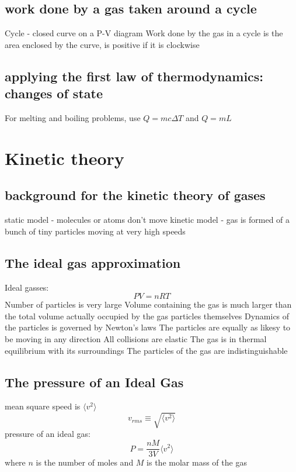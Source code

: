 \documentclass[twocolumn]{article}
\begin{document}
\subsection{work done by a gas taken around a cycle}
\begin{outline}
\1 Cycle - closed curve on a P-V diagram
\1 Work done by the gas in a cycle is the area enclosed by the curve, is positive if it is clockwise
\end{outline}
\subsection{applying the first law of thermodynamics: changes of state}
\begin{outline}
\1 For melting and boiling problems, use \(Q=mc\Delta T\) and \(Q=mL\)
\end{outline}
\section{Kinetic theory} 
\subsection{background for the kinetic theory of gases}
\begin{outline}
\1 static model - molecules or atoms don't move
\1 kinetic model - gas is formed of a bunch of tiny particles moving at very high speeds
\end{outline}
\subsection{The ideal gas approximation}
\begin{outline}
\1 Ideal gasses: \[PV=nRT\]
\2 Number of particles is very large
\2 Volume containing the gas is much larger than the total volume actually occupied by the gas particles themselves
\2 Dynamics of the particles is governed by Newton's laws
\2 The particles are equally as likesy to be moving in any direction
\2 All collisions are elastic
\2 The gas is in thermal equilibrium with its surroundings
\2 The particles of the gas are indistinguishable
\end{outline}
\subsection{The pressure of an Ideal Gas}
\begin{outline}
\1 mean square speed is $\langle v^2\rangle$
\0 \[v_{rms}\equiv\sqrt{\langle v^2\rangle}\]
\1 pressure of an ideal gas: \[P=\dfrac{nM}{3V}\langle v^2\rangle\] where $n$ is the number of moles and $M$ is the molar mass of the gas
\end{outline}
\end{document}
